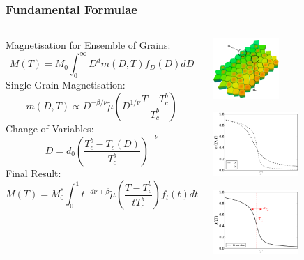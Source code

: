 \documentclass{beamer}
\begin{document}
\begin{frame}
	\frametitle{Fundamental Formulae}
	\begin{columns}
	\column{8cm}
	\small{
	\newline
	Magnetisation for Ensemble of Grains:
	$$
	M(T) = M_0\int_0^\infty D^{d} m(D,T) f_D(D) dD
	$$
	Single Grain Magnetisation:
	$$
	m(D,T) \propto D^{-\beta/\nu} \tilde{\mu} \left(D^{1/\nu}\frac{T-T_c^b}{T_c^b}\right)
	$$
	Change of Variables:
	$$
	D = d_0\left(\frac{T_c^b - T_c(D)}{T_c^b}\right)^{-\nu}
	$$
	Final Result:
	$$
	M(T) = M_0^*\int_0^1 t^{-d\nu +\beta} \tilde{\mu}\left(\frac{T-T_c^b}{tT_c^b}\right) f_t(t) dt
	$$}
	\column{4cm}
	\begin{center}
	\includegraphics[width=2.5cm]{Images/grains2}

	\includegraphics[width=3.25cm]{Images/Ds_noinset}

	\includegraphics[width=3.25cm]{Images/Aggregate}
	\end{center}
	\end{columns}
\end{frame}
\end{document}
